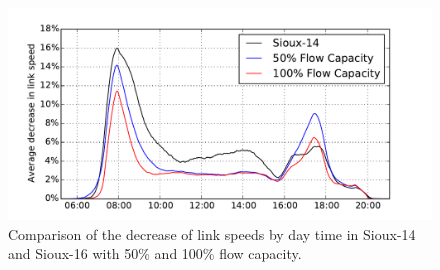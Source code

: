\begin{figure}
    \centering
    \includegraphics[width=1.0\textwidth]{figures/sioux_speeds.pdf}
    \caption{Comparison of the decrease of link speeds by day time in Sioux-14 and Sioux-16 with 50\% and 100\% flow capacity.}
    \label{fig:sioux_speeds}
\end{figure}


